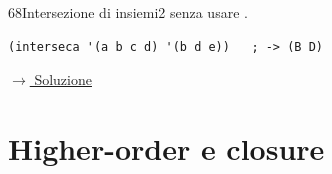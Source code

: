 \label{ex:68}
\begin{colbox}{68}{Intersezione di insiemi}{2}
  senza usare .
\nopagebreak
\begin{lstlisting}
(interseca '(a b c d) '(b d e))   ; -> (B D)
\end{lstlisting}


\small\color{black!55}\hyperref[sol:68]{$\rightarrow$ Soluzione}\normalsize\color{black}
\end{colbox}

\setcounter{section}{3}
\section{Higher-order e closure}

